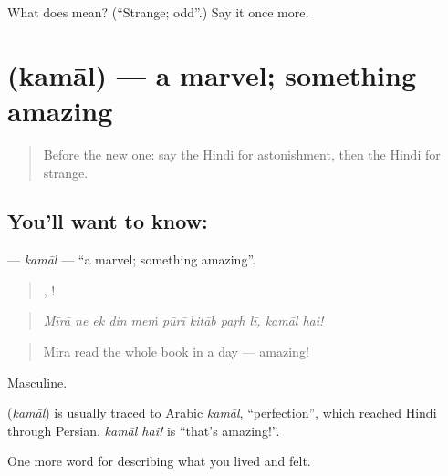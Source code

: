 \begin{tcolorbox}[breakable,colback=teal!4,colframe=teal!35!black,title={Before you move on}]
What does  mean? (\textquotedblleft{}Strange; odd\textquotedblright{}.) Say it once more.
\end{tcolorbox}
\section[\texorpdfstring{\hi{कमाल} (kamāl)}{कमाल (kamāl)}]{ (kamāl) — a marvel; something amazing}

\label{lesson:HI-C454-kamal}



\begin{quote}
Before the new one: say the Hindi for astonishment, then the Hindi for strange.
\end{quote}

\subsection*{You'll want to know: }
\textbf{} — \emph{kamāl} — \textquotedblleft{}a marvel; something amazing\textquotedblright{}.

\begin{quote}
        ,  !
\end{quote}

\begin{quote}
\emph{Mīrā ne ek din meṁ pūrī kitāb paṛh lī, kamāl hai!}
\end{quote}

\begin{quote}
Mira read the whole book in a day — amazing!
\end{quote}

Masculine.

\begin{cousinweb}
\textbf{} (\emph{kamāl}) is usually traced to Arabic \emph{kamāl}, \textquotedblleft{}perfection\textquotedblright{}, which reached Hindi through Persian. \emph{kamāl hai!} is \textquotedblleft{}that's amazing!\textquotedblright{}.
\end{cousinweb}

\begin{grammarlens}[title={What you've built}]
One more word for describing what you lived and felt.
\end{grammarlens}

